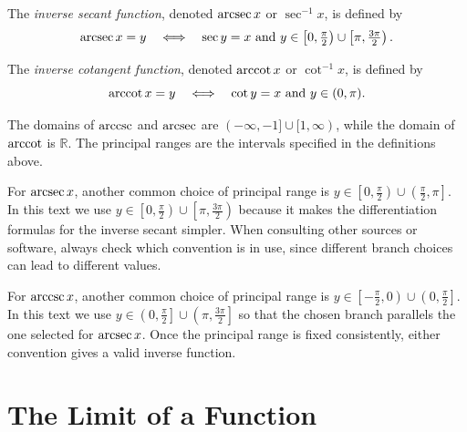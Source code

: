 \begin{definition}
The \emph{inverse secant function}, denoted \(\operatorname{arcsec} x\) or \(\sec^{-1} x\), is defined by
\[
\operatorname{arcsec} x = y \quad \Longleftrightarrow \quad \sec y = x \text{ and } y \in \left[0, \tfrac{\pi}{2}\right) \cup \left[\pi, \tfrac{3\pi}{2}\right).
\]
\end{definition}

\begin{definition}
The \emph{inverse cotangent function}, denoted \(\operatorname{arccot} x\) or \(\cot^{-1} x\), is defined by
\[
\operatorname{arccot} x = y \quad \Longleftrightarrow \quad \cot y = x \text{ and } y \in (0, \pi).
\]
\end{definition}

The domains of \(\operatorname{arccsc}\) and \(\operatorname{arcsec}\) are \((-\infty, -1] \cup [1, \infty)\), while the domain of \(\operatorname{arccot}\) is \(\mathbb{R}\). The principal ranges are the intervals specified in the definitions above.

\begin{remark}
For \(\operatorname{arcsec} x\), another common choice of principal range is \(y \in \left[0, \tfrac{\pi}{2}\right) \cup \left(\tfrac{\pi}{2}, \pi\right]\). In this text we use \(y \in \left[0, \tfrac{\pi}{2}\right) \cup \left[\pi, \tfrac{3\pi}{2}\right)\) because it makes the differentiation formulas for the inverse secant simpler. When consulting other sources or software, always check which convention is in use, since different branch choices can lead to different values.
\end{remark}

\begin{remark}
For \(\operatorname{arccsc} x\), another common choice of principal range is \(y \in \left[-\tfrac{\pi}{2}, 0\right) \cup \left(0, \tfrac{\pi}{2}\right]\). In this text we use \(y \in \left(0, \tfrac{\pi}{2}\right] \cup \left(\pi, \tfrac{3\pi}{2}\right]\) so that the chosen branch parallels the one selected for \(\operatorname{arcsec} x\). Once the principal range is fixed consistently, either convention gives a valid inverse function.
\end{remark}


\section{The Limit of a Function}

